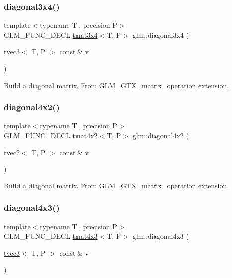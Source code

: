 \subsubsection{\texorpdfstring{diagonal3x4()}{diagonal3x4()}}
{\footnotesize\ttfamily template$<$typename T , precision P$>$ \\
G\+L\+M\+\_\+\+F\+U\+N\+C\+\_\+\+D\+E\+CL \hyperlink{structglm_1_1tmat3x4}{tmat3x4}$<$T, P$>$ glm\+::diagonal3x4 (\begin{DoxyParamCaption}\item[{\hyperlink{structglm_1_1tvec3}{tvec3}$<$ T, P $>$ const \&}]{v }\end{DoxyParamCaption})}

Build a diagonal matrix. From G\+L\+M\+\_\+\+G\+T\+X\+\_\+matrix\+\_\+operation extension. \mbox{\label{group__gtx__matrix__operation_ga70cc5632aa9f41e7cf0b81fee6f2bfe6}} 
\subsubsection{\texorpdfstring{diagonal4x2()}{diagonal4x2()}}
{\footnotesize\ttfamily template$<$typename T , precision P$>$ \\
G\+L\+M\+\_\+\+F\+U\+N\+C\+\_\+\+D\+E\+CL \hyperlink{structglm_1_1tmat4x2}{tmat4x2}$<$T, P$>$ glm\+::diagonal4x2 (\begin{DoxyParamCaption}\item[{\hyperlink{structglm_1_1tvec2}{tvec2}$<$ T, P $>$ const \&}]{v }\end{DoxyParamCaption})}

Build a diagonal matrix. From G\+L\+M\+\_\+\+G\+T\+X\+\_\+matrix\+\_\+operation extension. \mbox{\label{group__gtx__matrix__operation_ga4242ea5681f81539e0c5b54fadcd9ddf}} 
\subsubsection{\texorpdfstring{diagonal4x3()}{diagonal4x3()}}
{\footnotesize\ttfamily template$<$typename T , precision P$>$ \\
G\+L\+M\+\_\+\+F\+U\+N\+C\+\_\+\+D\+E\+CL \hyperlink{structglm_1_1tmat4x3}{tmat4x3}$<$T, P$>$ glm\+::diagonal4x3 (\begin{DoxyParamCaption}\item[{\hyperlink{structglm_1_1tvec3}{tvec3}$<$ T, P $>$ const \&}]{v }\end{DoxyParamCaption})}

